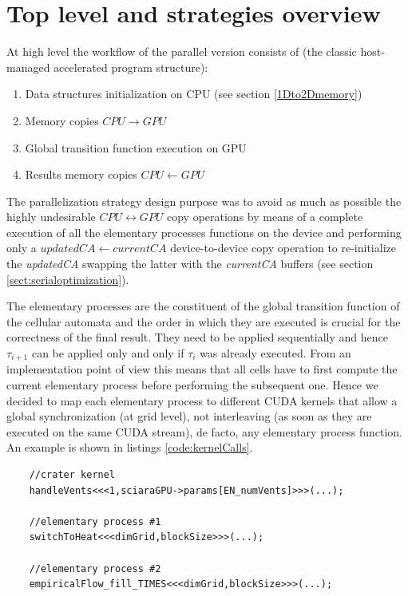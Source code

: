 \section{Top level and strategies overview}

\label{sect:topLevelStrategies}
At high level the workflow of the parallel version consists of (the classic
host-managed accelerated program structure):
\begin{enumerate}
  \item Data structures initialization on CPU (see section \ref{1Dto2Dmemory})
  \item Memory copies \(CPU \rightarrow GPU\)
  \item Global transition function execution on GPU
  \item Results memory copies \(CPU \leftarrow GPU\)
\end{enumerate}

The parallelization strategy design purpose was to avoid as much as possible the
highly undesirable \(CPU \leftrightarrow GPU \) copy operations by means of a
complete execution of all the elementary processes functions on the device and
performing only a \(updatedCA \leftarrow currentCA \) device-to-device copy
operation to re-initialize the \textit{updatedCA} swapping the latter with the
\textit{currentCA} buffers (see section \ref{sect:serialoptimization}).

The elementary processes are the constituent of the global
transition function of the cellular automata and the order in which they are
executed is crucial for the correctness of the final result. They need to be
applied sequentially and hence \(\tau_{i+1}\) can be applied only and only if
\(\tau_{i}\) was already executed. From an implementation point of view this
means that all cells have to first compute the current elementary process before
performing the subsequent one. Hence we decided to map each elementary process
to different CUDA kernels that allow a global synchronization (at grid level),
not interleaving (as soon as they are executed on the same CUDA stream), de
facto, any elementary process function. An example is shown in listings
\ref{code:kernelCalls}.

\begin{lstlisting}
	//crater kernel
	handleVents<<<1,sciaraGPU->params[EN_numVents]>>>(...);
	
	//elementary process #1
	switchToHeat<<<dimGrid,blockSize>>>(...);
	
	//elementary process #2
	empiricalFlow_fill_TIMES<<<dimGrid,blockSize>>>(...);
\end{lstlisting}

